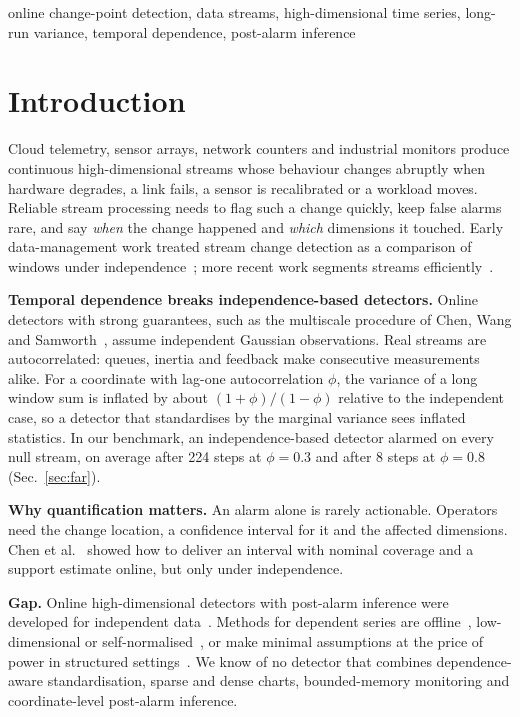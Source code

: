 \documentclass[conference]{IEEEtran}
\begin{document}
\begin{IEEEkeywords}
online change-point detection, data streams, high-dimensional time series, long-run variance, temporal dependence, post-alarm inference
\end{IEEEkeywords}

\section{Introduction}
Cloud telemetry, sensor arrays, network counters and industrial monitors produce continuous high-dimensional streams whose behaviour changes abruptly when hardware degrades, a link fails, a sensor is recalibrated or a workload moves. Reliable stream processing needs to flag such a change quickly, keep false alarms rare, and say \emph{when} the change happened and \emph{which} dimensions it touched. Early data-management work treated stream change detection as a comparison of windows under independence~\cite{kifer2004}; more recent work segments streams efficiently~\cite{ermshaus2024}.

\textbf{Temporal dependence breaks independence-based detectors.} Online detectors with strong guarantees, such as the multiscale procedure of Chen, Wang and Samworth~\cite{chen2022}, assume independent Gaussian observations. Real streams are autocorrelated: queues, inertia and feedback make consecutive measurements alike. For a coordinate with lag-one autocorrelation $\phi$, the variance of a long window sum is inflated by about $(1+\phi)/(1-\phi)$ relative to the independent case, so a detector that standardises by the marginal variance sees inflated statistics. In our benchmark, an independence-based detector alarmed on every null stream, on average after 224 steps at $\phi=0.3$ and after 8 steps at $\phi=0.8$ (Sec.~\ref{sec:far}).

\textbf{Why quantification matters.} An alarm alone is rarely actionable. Operators need the change location, a confidence interval for it and the affected dimensions. Chen et al.~\cite{chen2024} showed how to deliver an interval with nominal coverage and a support estimate online, but only under independence.

\textbf{Gap.} Online high-dimensional detectors with post-alarm inference were developed for independent data~\cite{chen2024,chen2022,mei2010,xie2013}. Methods for dependent series are offline~\cite{padilla2023}, low-dimensional or self-normalised~\cite{shao2010}, or make minimal assumptions at the price of power in structured settings~\cite{shekhar2024}. We know of no detector that combines dependence-aware standardisation, sparse and dense charts, bounded-memory monitoring and coordinate-level post-alarm inference.
\end{document}

